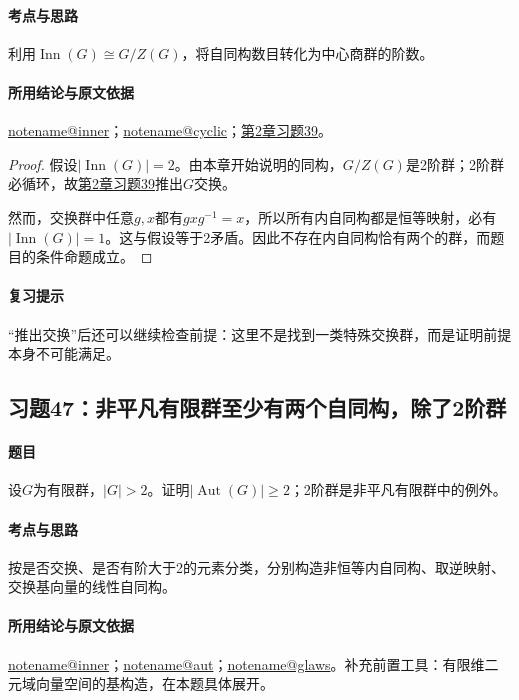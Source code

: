 \documentclass[UTF8,a4paper,11pt,fontset=windows]{ctexart}
\makeatletter
\DeclareMathOperator{\Aut}{Aut}\DeclareMathOperator{\Inn}{Inn}
\newcommand{\noteref}[1]{\hyperref[note:#1]{\csname notename@#1\endcsname}}
\newcommand{\exref}[2]{\hyperref[ex:#1:#2]{第#1章习题#2}}
\makeatother
\begin{document}
\paragraph{考点与思路}
利用$\operatorname{Inn}(G)\cong G/Z(G)$，将自同构数目转化为中心商群的阶数。

\paragraph{所用结论与原文依据}
\noteref{inner}；\noteref{cyclic}；\exref{2}{39}。


\begin{proof}
假设$|\operatorname{Inn}(G)|=2$。由本章开始说明的同构，$G/Z(G)$是2阶群；2阶群必循环，故\exref{2}{39}推出$G$交换。

然而，交换群中任意$g,x$都有$gxg^{-1}=x$，所以所有内自同构都是恒等映射，必有$|\operatorname{Inn}(G)|=1$。这与假设等于2矛盾。因此不存在内自同构恰有两个的群，而题目的条件命题成立。
\end{proof}

\paragraph{复习提示}
“推出交换”后还可以继续检查前提：这里不是找到一类特殊交换群，而是证明前提本身不可能满足。


\subsection{习题47：\texorpdfstring{非平凡有限群至少有两个自同构，除了2阶群}{非平凡有限群至少有两个自同构，除了2阶群}}
\label{ex:2:47}

\paragraph{题目}
设$G$为有限群，$|G|>2$。证明$|\Aut(G)|\ge2$；2阶群是非平凡有限群中的例外。

\paragraph{考点与思路}
按是否交换、是否有阶大于2的元素分类，分别构造非恒等内自同构、取逆映射、交换基向量的线性自同构。

\paragraph{所用结论与原文依据}
\noteref{inner}；\noteref{aut}；\noteref{glaws}。补充前置工具：有限维二元域向量空间的基构造，在本题具体展开。
\end{document}
